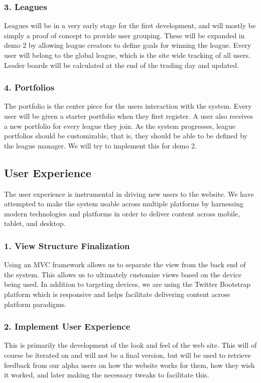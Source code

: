 \subsubsection{3. Leagues}
Leagues will be in a very early stage for the first development, and will mostly
be simply a proof of concept to provide user grouping.  These will be expanded
in demo 2 by allowing league creators to define goals for winning the league.
Every user will belong to the global league, which is the site wide tracking
of all users.  Leader boards will be calculated at the end of the trading day
and updated.\\
\subsubsection{4. Portfolios}
The portfolio is the center piece for the users interaction with the system.
Every user will be given a starter portfolio when they first register.  A user
also receives a new portfolio for every league they join.  As the system
progresses, league portfolios should be customizable, that is, they should be
able to be defined by the league manager.  We will try to implement this for
demo 2.\\
\subsection{User Experience}
The user experience is instrumental in driving new users to the website.  We
have attempted to make the system usable across multiple platforms by harnessing
modern technologies and platforms in order to deliver content across mobile,
tablet, and desktop.\\

\subsubsection{1. View Structure Finalization}
Using an MVC framework allows us to separate the view from the back end of the
system.  This allows us to ultimately customize views based on the device being
used.  In addition to targeting devices, we are using the Twitter Bootstrap
platform which is responsive and helps facilitate delivering content across
platform paradigms.
\subsubsection{2. Implement User Experience}
This is primarily the development of the look and feel of the web site.  This
will of course be iterated on and will not be a final version, but will be used
to retrieve feedback from our alpha users on how the website works for them, how
they wish it worked, and later making the necessary tweaks to facilitate this.\\
